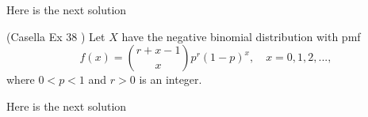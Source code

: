 \documentclass[12pt,letterpaper]{exam}
\begin{document}
\begin{questions}
	\begin{solution}
		Here is the next solution
	\end{solution}
	
	\setcounter{question}{37}
	\question  (Casella Ex 38 ) Let $X$ have the negative binomial distribution with pmf
	$$ f(x) = { r + x -1 \choose x} p^r (1-p)^x, \quad x= 0,1,2,...,$$
	where $0 < p< 1$ and $r >0$ is an integer.
	\begin{solution}
		Here is the next solution
	\end{solution}

\end{questions}
\end{document}
